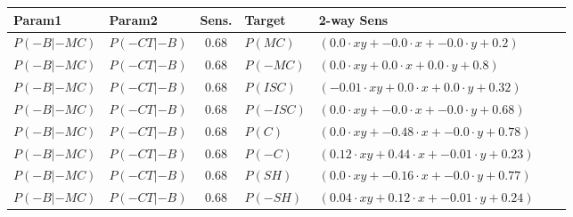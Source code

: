 \begin{tabular}{|l|l|c|l|l|l|l|}
\hline
Param1 & Param2 & Sens. & Target  & 2-way Sens \\
\hline
$P(-B|-MC)$ & $P(-CT|-B)$ & 0.68 & $P(MC)$ & $(0.0·xy + -0.0·x + -0.0·y + 0.2)$ \\
\hline
$P(-B|-MC)$ & $P(-CT|-B)$ & 0.68 & $P(-MC)$ & $(0.0·xy + 0.0·x + 0.0·y + 0.8)$ \\
\hline
$P(-B|-MC)$ & $P(-CT|-B)$ & 0.68 & $P(ISC)$ & $(-0.01·xy + 0.0·x + 0.0·y + 0.32)$ \\
\hline
$P(-B|-MC)$ & $P(-CT|-B)$ & 0.68 & $P(-ISC)$ & $(0.0·xy + -0.0·x + -0.0·y + 0.68)$ \\
\hline
$P(-B|-MC)$ & $P(-CT|-B)$ & 0.68 & $P(C)$ & $(0.0·xy + -0.48·x + -0.0·y + 0.78)$ \\
\hline
$P(-B|-MC)$ & $P(-CT|-B)$ & 0.68 & $P(-C)$ & $(0.12·xy + 0.44·x + -0.01·y + 0.23)$ \\
\hline
$P(-B|-MC)$ & $P(-CT|-B)$ & 0.68 & $P(SH)$ & $(0.0·xy + -0.16·x + -0.0·y + 0.77)$ \\
\hline
$P(-B|-MC)$ & $P(-CT|-B)$ & 0.68 & $P(-SH)$ & $(0.04·xy + 0.12·x + -0.01·y + 0.24)$ \\
\hline
\end{tabular}
